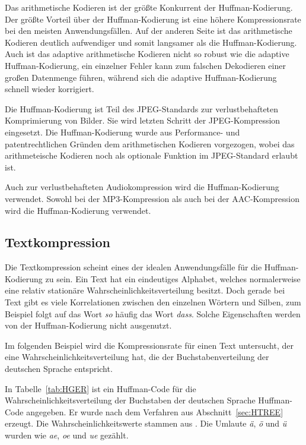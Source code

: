 \documentclass[twoside,11pt,a4paper]{article}
\theoremstyle{break}
\begin{document}
Das arithmetische Kodieren ist der größte Konkurrent der
Huffman-Kodierung. Der größte Vorteil über der Huffman-Kodierung ist
eine höhere Kompressionsrate bei den meisten Anwendungsfällen. Auf der
anderen Seite ist das arithmetische Kodieren deutlich aufwendiger und
somit langsamer als die Huffman-Kodierung. Auch ist das adaptive
arithmetische Kodieren nicht so robust wie die adaptive
Huffman-Kodierung, ein einzelner Fehler kann zum falschen Dekodieren
einer großen Datenmenge führen, während sich die adaptive
Huffman-Kodierung schnell wieder korrigiert. \cite{Bookstein:1993}

Die Huffman-Kodierung ist Teil des JPEG-Standards zur verlustbehafteten
Komprimierung von Bilder. Sie wird letzten Schritt der
JPEG-Kompression eingesetzt. Die Huffman-Kodierung wurde aus
Performance- und patentrechtlichen Gründen dem arithmetischen Kodieren
vorgezogen, wobei das arithmeteische Kodieren noch als optionale
Funktion im JPEG-Standard erlaubt ist. \cite{Wallace:1991}

Auch zur verlustbehafteten Audiokompression wird die Huffman-Kodierung
verwendet. Sowohl bei der MP3-Kompression als auch bei der
AAC-Kompression wird die Huffman-Kodierung verwendet. \cite[S. 1055 -- S. 1076]{Salomon:2010}

\subsection{Textkompression}
Die Textkompression scheint eines der idealen Anwendungsfälle für die
Huffman-Kodier\-ung zu sein. Ein Text hat ein eindeutiges Alphabet,
welches normalerweise eine relativ stationäre
Wahrscheinlichkeitsverteilung besitzt. Doch gerade bei Text gibt es
viele Korrelationen zwischen den einzelnen Wörtern und Silben, zum
Beispiel folgt auf das Wort \emph{so} häufig das Wort
\emph{dass}. Solche Eigenschaften werden von der Huffman-Kodierung
nicht ausgenutzt. \cite[S. 74]{Sayood:2006}

Im folgenden Beispiel wird die Kompressionsrate für einen Text
untersucht, der eine Wahrscheinlichkeitsverteilung hat, die der
Buchstabenverteilung der deutschen Sprache entspricht.

In Tabelle~\ref{tab:HGER} ist ein Huffman-Code für die
Wahrscheinlichkeitsverteilung der Buchstaben der deutschen Sprache
Huffman-Code angegeben. Er wurde nach dem Verfahren aus
Abschnitt~\ref{sec:HTREE} erzeugt. Die Wahrscheinlichkeitswerte
stammen aus \cite[S. 10]{Beutelspacher:2005}. Die Umlaute \emph{ä}, \emph{ö}
und \emph{ü} wurden wie \emph{ae}, \emph{oe} und \emph{ue} gezählt.
\end{document}
